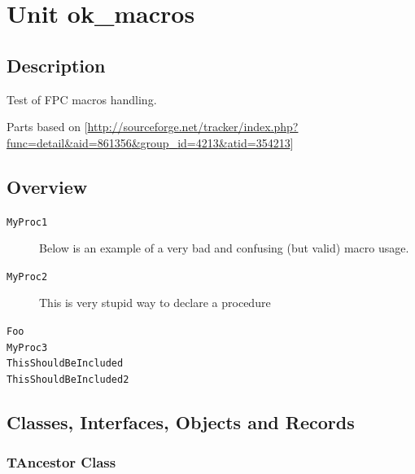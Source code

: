 \documentclass{report}
\newif\ifpdf
\begin{document}
\label{toc}\tableofcontents
\newpage
\newlength{\tmplength}
\chapter{Unit ok{\_}macros}
\label{ok_macros}
\section{Description}
Test of FPC macros handling.\hfill\vspace*{1ex}



Parts based on [\href{http://sourceforge.net/tracker/index.php?func=detail&aid=861356&group_id=4213&atid=354213}{http://sourceforge.net/tracker/index.php?func=detail{\&}aid=861356{\&}group{\_}id=4213{\&}atid=354213}]
\section{Overview}
\begin{description}
\item[\texttt{\begin{ttfamily}TAncestor\end{ttfamily} Class}]
\item[\texttt{\begin{ttfamily}TMyClass\end{ttfamily} Class}]
\end{description}
\begin{description}
\item[\texttt{MyProc1}]Below is an example of a very bad and confusing (but valid) macro usage.
\item[\texttt{MyProc2}]This is very stupid way to declare a procedure
\item[\texttt{Foo}]
\item[\texttt{MyProc3}]
\item[\texttt{ThisShouldBeIncluded}]
\item[\texttt{ThisShouldBeIncluded2}]
\end{description}
\section{Classes, Interfaces, Objects and Records}
\ifpdf
\subsection*{\large{\textbf{TAncestor Class}}\normalsize\hspace{1ex}\hrulefill}
\else
\end{document}
